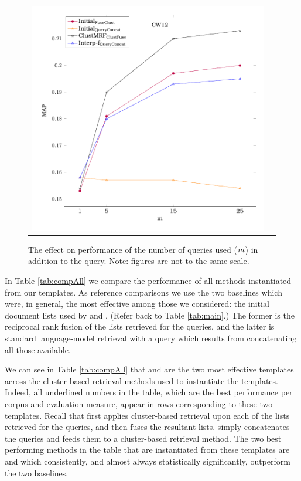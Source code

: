 \begin{figure}[t]
\begin{tabular}{cc}
\includegraphics[width=\figWidth, height=\figHeight]{Results2/cw12.pdf}
  \end{tabular}
  \caption{\label{fig:numQuery} The effect on performance of the number of queries used ($m$) in addition to the \titleQuery query. Note: figures are not to the same scale.}
  \end{figure}



In Table \ref{tab:compAll} we compare the performance of all methods
instantiated from our templates. As reference comparisons we use the two baselines which were, in general, the most effective among those we considered: the initial document lists used by \fuseClust and \queryCat. (Refer back to Table \ref{tab:main}.) The former is the reciprocal rank fusion of the lists retrieved for the queries, and the latter is standard language-model retrieval with a query which results from concatenating all those available.

We can see in Table \ref{tab:compAll} that \clustFuse and \queryCat
are the two most effective templates across the cluster-based retrieval methods used to instantiate the templates. Indeed, all underlined numbers in the table, which are the best performance per corpus and evaluation measure, appear in rows corresponding to these two templates. Recall that \clustFuse first applies cluster-based retrieval upon each of the lists retrieved for the queries, and then fuses the resultant lists. \queryCat simply concatenates the queries and feeds them to a cluster-based retrieval method. The two best performing methods in the table that are instantiated from these templates are \inst{\interp}{\queryCat} and \inst{\clustMRF}{\clustFuse} which consistently, and almost always statistically significantly, outperform the two baselines.


